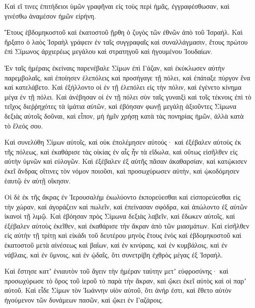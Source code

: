 {Καὶ εἴ τινες ἐπιτήδειοι ὑμῶν γραφῆναι εἰς τοὺς περὶ ἡμᾶς, ἐγγραφέσθωσαν, καὶ γινέσθω ἀναμέσον ἡμῶν εἰρήνη.
\par }{\PP {}Ἔτους ἑβδομηκοστοῦ καὶ ἑκατοστοῦ ᾔρθη ὁ ζυγὸς τῶν ἐθνῶν ἀπὸ τοῦ Ἰσραήλ.
Καὶ ἤρξατο ὁ λαὸς Ἰσραὴλ γράφειν ἐν ταῖς συγγραφαῖς καὶ συναλλάγμασιν, ἔτους πρώτου ἐπὶ Σίμωνος ἀρχιερέως μεγάλου καὶ στρατηγοῦ καὶ ἡγουμένου Ἰουδαίων.
\par }{\PP {}Ἐν ταῖς ἡμέραις ἐκείναις παρενέβαλε Σίμων ἐπὶ Γάζαν, καὶ ἐκύκλωσεν αὐτὴν παρεμβολαῖς, καὶ ἐποίησεν ἑλεπόλεις καὶ προσήγαγε τῇ πόλει, καὶ ἐπάταξε πύργον ἕνα καὶ κατελάβετο.
Καὶ ἐξήλλοντο οἱ ἐν τῇ ἑλεπόλει εἰς τὴν πόλιν, καὶ ἐγένετο κίνημα μέγα ἐν τῇ πόλει.
Καὶ ἀνέβησαν οἱ ἐν τῇ πόλει σὺν ταῖς γυναιξὶ καὶ τοῖς τέκνοις ἐπὶ τὸ τεῖχος διεῤῥηχότες τὰ ἱμάτια αὐτῶν, καὶ ἐβόησαν φωνῇ μεγάλῃ ἀξιοῦντες Σίμωνα δεξιὰς αὐτοῖς δοῦναι,
καὶ εἶπον, μὴ ἡμῖν χρήσῃ κατὰ τὰς πονηρίας ἡμῶν, ἀλλὰ κατὰ τὸ ἔλεός σου.
\par }{\PP {}Καὶ συνελύθη Σίμων αὐτοῖς, καὶ οὐκ ἐπολέμησεν αὐτούς· καὶ ἐξέβαλεν αὐτοὺς ἐκ τῆς πόλεως, καὶ ἐκαθάρισε τὰς οἰκίας ἐν αἷς ἦν τὰ εἴδωλα, καὶ οὕτως εἰσῆλθεν εἰς αὐτὴν ὑμνῶν καὶ εὐλογῶν.
Καὶ ἐξέβαλεν ἐξ αὐτῆς πᾶσαν ἀκαθαρσίαν, καὶ κατῴκισεν ἐκεῖ ἄνδρας οἵτινες τὸν νόμον ποιοῦσι, καὶ προσωχύρωσεν αὐτὴν, καὶ ᾠκοδόμησεν ἑαυτῷ ἑν αὐτῇ οἴκησιν.
\par }{\PP {}Οἱ δὲ ἐκ τῆς ἄκρας ἐν Ἱερουσαλὴμ ἐκωλύοντο ἐκπορεύεσθαι καὶ εἰσπορεύεσθαι εἰς τὴν χώραν, καὶ ἀγοράζειν καὶ πωλεῖν, καὶ ἐπείνασαν σφόδρα, καὶ ἀπώλοντο ἐξ αὐτῶν ἱκανοὶ τῇ λιμῷ.
Καὶ ἐβόησαν πρὸς Σίμωνα δεξιὰς λαβεῖν, καὶ ἔδωκεν αὐτοῖς, καὶ ἐξέβαλεν αὐτοὺς ἐκεῖθεν, καὶ ἐκαθάρισε τὴν ἄκραν ἀπὸ τῶν μιασμάτων.
Καὶ εἰσῆλθεν εἰς αὐτὴν τῇ τρίτῃ καὶ εἰκάδι τοῦ δευτέρου μηνὸς ἔτους ἑνὸς καὶ ἑβδομηκοστοῦ καὶ ἑκατοστοῦ μετὰ αἰνέσεως καὶ βαΐων, καὶ ἐν κινύραις, καὶ ἐν κυμβάλοις, καὶ ἐν νάβλαις, καὶ ἐν ὕμνοις, καὶ ἐν ᾠδαῖς, ὅτι συνετρίβη ἐχθρὸς μέγας ἐξ Ἰσραήλ.
\par }{\PP {}Καὶ ἔστησε κατʼ ἐνιαυτὸν τοῦ ἄγειν τὴν ἡμέραν ταύτην μετʼ εὐφροσύνης· καὶ προσωχύρωσε τὸ ὄρος τοῦ ἱεροῦ τὸ παρὰ τὴν ἄκραν, καὶ ᾤκει ἐκεῖ αὐτὸς καὶ οἱ παρʼ αὐτοῦ.
Καὶ εἶδε Σίμων τὸν Ἰωάννην υἱὸν αὐτοῦ, ὅτι ἀνήρ ἐστι, καὶ ἔθετο αὐτὸν ἡγούμενον τῶν δυνάμεων πασῶν, καὶ ᾤκει ἐν Γαζάροις.

}
